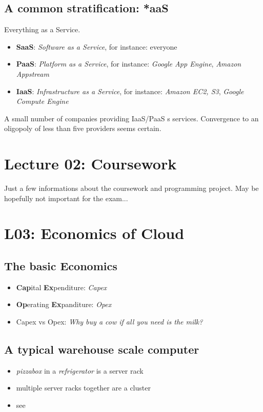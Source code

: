\documentclass[a4paper]{article}
\begin{document}
\begin{multicols}{3}
\subsection*{A common stratification: *aaS}
\label{subsec:everythingasaservice}
Everything as a Service.
\begin{itemize}
    \item \textbf{SaaS}: \textit{Software as a Service}, for instance: everyone
    \item \textbf{PaaS}: \textit{Platform as a Service}, for instance: \textit{Google App Engine}, \textit{Amazon Appstream}
    \item \textbf{IaaS}: \textit{Infrastructure as a Service}, for instance: \textit{Amazon EC2, S3}, \textit{Google Compute Engine}
\end{itemize}

A small number of companies providing IaaS/PaaS s services. Convergence to an oligopoly of less than five providers seems certain.

\section*{Lecture 02: Coursework}

Just a few informations about the coursework and programming project. May be hopefully not important for the exam...

\section*{L03: Economics of Cloud}

\subsection*{The basic Economics}
\begin{itemize}
    \item \textbf{Cap}ital \textbf{Ex}penditure: \textit{Capex}
    \item \textbf{Op}erating \textbf{Ex}panditure: \textit{Opex}
    \item Capex vs Opex: \textit{Why buy a cow if all you need is the milk?}
\end{itemize}

\subsection*{A typical warehouse scale computer}
\begin{itemize}
    \item \textit{pizzabox} in a \textit{refrigerator} is a server rack
    \item multiple server racks together are a cluster
    \item see 
\end{itemize}


\end{multicols}
\end{document}
